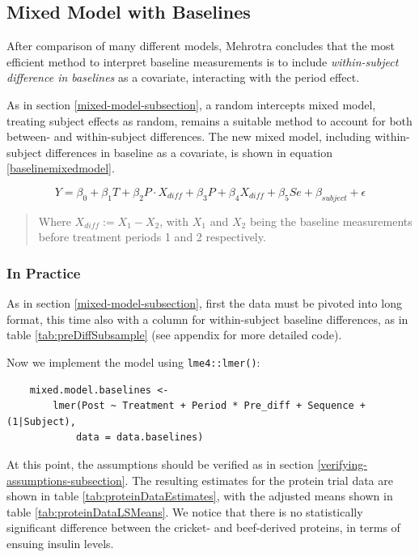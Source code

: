 \documentclass[12pt, TexShade, letterpaper]{report}
\begin{document}
\subsection{Mixed Model with Baselines}
After comparison of many different models, Mehrotra \cite{mehrotra2014} concludes that the most efficient method to interpret baseline measurements is to include \textit{within-subject difference in baselines} as a covariate, interacting with the period effect.

As in section \ref{mixed-model-subsection}, a random intercepts mixed model, treating subject effects as random, remains a suitable method to account for both between- and within-subject differences. The new mixed model, including within-subject differences in baseline as a covariate, is shown in equation \ref{baselinemixedmodel}.

\begin{equation}
    Y = \beta_0 + \beta_1 T + \beta_2 P \cdot X_{diff} + \beta_3 P +
    \beta_4 X_{diff} + \beta_5 Se + \beta_{subject} + \epsilon
    \label{baselinemixedmodel}
\end{equation}
\begin{quote}
    Where $X_{diff} := X_1 - X_2$, with $X_1$ and $X_2$ being the baseline measurements before treatment periods 1 and 2 respectively.
\end{quote}

\FloatBarrier
\subsubsection{In Practice}
As in section \ref{mixed-model-subsection}, first the data must be pivoted into long format, this time also with a column for within-subject baseline differences, as in table \ref{tab:preDiffSubsample} (see appendix for more detailed code).

Now we implement the model using \texttt{lme4::lmer()}:
\begin{verbatim}
    mixed.model.baselines <-
        lmer(Post ~ Treatment + Period * Pre_diff + Sequence + (1|Subject),
            data = data.baselines)
\end{verbatim}
At this point, the assumptions should be verified as in section \ref{verifying-assumptions-subsection}. The resulting estimates for the protein trial data are shown in table \ref{tab:proteinDataEstimates}, with the adjusted means shown in table \ref{tab:proteinDataLSMeans}. We notice that there is no statistically significant difference between the cricket- and beef-derived proteins, in terms of ensuing insulin levels.


\end{document}
